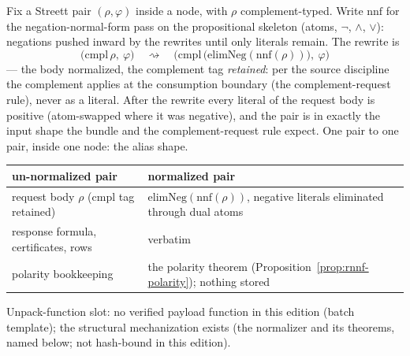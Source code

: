 

\begin{brecipe}
\label{rec:rnnf-filled}
Fix a Streett pair $(\rho, \varphi)$ inside a 
node, with $\rho$ complement-typed. Write $\mathrm{nnf}$ for the
negation-normal-form pass on the propositional skeleton (atoms,
$\neg$, $\wedge$, $\vee$): negations pushed inward by the
 rewrites until only literals remain. The rewrite
is
\[
\bigl(\mathrm{cmpl}\,\rho,\ \varphi\bigr)
\quad\rightsquigarrow\quad
\bigl(\mathrm{cmpl}\,\bigl(\mathrm{elimNeg}(\mathrm{nnf}(\rho))\bigr),\ \varphi\bigr)
\]
--- the body normalized, the complement tag \emph{retained}: per the
source discipline the complement applies at the consumption boundary
(the complement-request rule), never as a literal. After the rewrite
every literal of the request body is positive (atom-swapped where it
was negative), and the pair is in exactly the input shape the
bundle and the complement-request rule expect. One pair to one pair,
inside one node: the alias shape.
\end{brecipe}

\begin{brecipe}\label{rec:rnnf-transport}
\begin{center}\small
\begin{tabular}{@{}ll@{}}
\textbf{un-normalized pair} & \textbf{normalized pair}\\
\midrule
request body $\rho$ ($\mathrm{cmpl}$ tag retained) & $\mathrm{elimNeg}(\mathrm{nnf}(\rho))$, negative literals eliminated through dual atoms\\
response formula, certificates, rows & verbatim\\
polarity bookkeeping & the polarity theorem (Proposition~\ref{prop:rnnf-polarity}); nothing stored\\
\end{tabular}
\end{center}
Unpack-function slot: no verified payload function in this edition (batch template); the
structural mechanization exists (the normalizer and its theorems, named
below; not hash-bound in this edition).
\end{brecipe}

